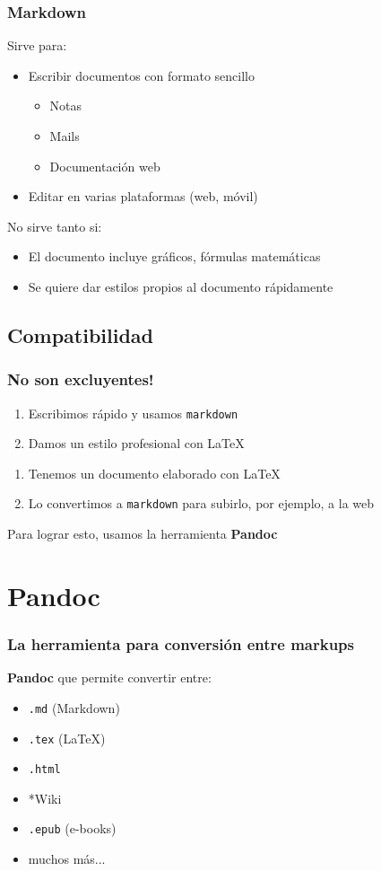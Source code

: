 \documentclass[svgnames]{beamer}
\begin{document}
\begin{frame}
  \frametitle{Markdown}
  Sirve para:
  \begin{itemize}
    \item Escribir documentos con formato sencillo
    \begin{itemize}
      \item Notas
      \item Mails
      \item Documentación web
    \end{itemize}
    \item Editar en varias plataformas (web, móvil) 
  \end{itemize}\pause
  No sirve tanto si:
  \begin{itemize}
    \item El documento incluye gráficos, fórmulas matemáticas
    \item Se quiere dar estilos propios al documento rápidamente
  \end{itemize}
\end{frame}

\subsection{Compatibilidad}

\begin{frame}
  \frametitle{No son excluyentes!}
  \begin{enumerate}
    \item Escribimos rápido y usamos \texttt{markdown}
    \item Damos un estilo profesional con \LaTeX
  \end{enumerate}\pause
  \begin{enumerate}
    \item Tenemos un documento elaborado con \LaTeX
    \item Lo convertimos a \texttt{markdown} para subirlo, por ejemplo, a la web
  \end{enumerate}\pause
  Para lograr esto, usamos la herramienta \textbf{Pandoc}
\end{frame}

\section{Pandoc}

\begin{frame}
  \frametitle{La herramienta para conversión entre markups}
  \textbf{Pandoc} que permite convertir entre:
  \begin{itemize}
   \item \texttt{.md} (Markdown)
   \item \texttt{.tex} (\LaTeX)
   \item \texttt{.html}
   \item *Wiki
   \item \texttt{.epub} (e-books)
   \item muchos más...
  \end{itemize}
\end{frame}
\end{document}
